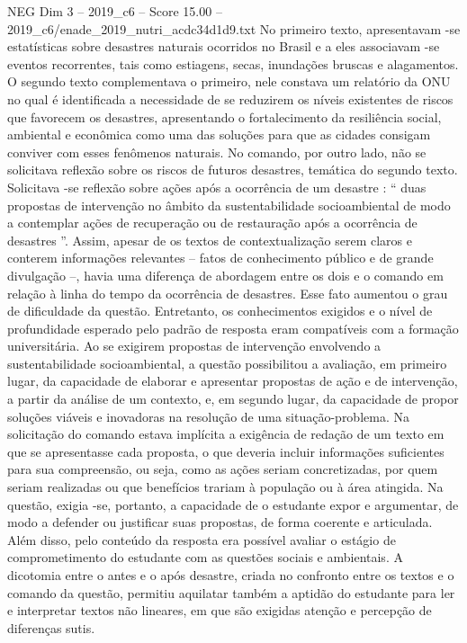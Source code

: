 \begin{textsample}{NEG Dim 3 – 2019\_c6 – Score 15.00 – 2019\_c6/enade\_2019\_nutri\_acdc34d1d9.txt}
No primeiro texto, apresentavam -se estatísticas sobre desastres naturais ocorridos no Brasil e a eles associavam -se eventos recorrentes, tais como estiagens, secas, inundações bruscas e alagamentos.
O segundo texto complementava o primeiro, nele constava um relatório da ONU no qual é identificada a necessidade de se reduzirem os níveis existentes de riscos que favorecem os desastres, apresentando o fortalecimento da resiliência social, ambiental e econômica como uma das soluções para que as cidades consigam conviver com esses fenômenos naturais.
No comando, por outro lado, não se solicitava reflexão sobre os riscos de futuros desastres, temática do segundo texto.
Solicitava -se reflexão sobre ações após a ocorrência de um desastre : “ duas propostas de intervenção no âmbito da sustentabilidade socioambiental de modo a contemplar ações de recuperação ou de restauração após a ocorrência de desastres ”.
Assim, apesar de os textos de contextualização serem claros e conterem informações relevantes – fatos de conhecimento público e de grande divulgação –, havia uma diferença de abordagem entre os dois e o comando em relação à linha do tempo da ocorrência de desastres.
Esse fato aumentou o grau de dificuldade da questão.
Entretanto, os conhecimentos exigidos e o nível de profundidade esperado pelo padrão de resposta eram compatíveis com a formação universitária.
Ao se exigirem propostas de intervenção envolvendo a sustentabilidade socioambiental, a questão possibilitou a avaliação, em primeiro lugar, da capacidade de elaborar e apresentar propostas de ação e de intervenção, a partir da análise de um contexto, e, em segundo lugar, da capacidade de propor soluções viáveis e inovadoras na resolução de uma situação-problema.
Na solicitação do comando estava implícita a exigência de redação de um texto em que se apresentasse cada proposta, o que deveria incluir informações suficientes para sua compreensão, ou seja, como as ações seriam concretizadas, por quem seriam realizadas ou que benefícios trariam à população ou à área atingida.
Na questão, exigia -se, portanto, a capacidade de o estudante expor e argumentar, de modo a defender ou justificar suas propostas, de forma coerente e articulada.
Além disso, pelo conteúdo da resposta era possível avaliar o estágio de comprometimento do estudante com as questões sociais e ambientais.
A dicotomia entre o antes e o após desastre, criada no confronto entre os textos e o comando da questão, permitiu aquilatar também a aptidão do estudante para ler e interpretar textos não lineares, em que são exigidas atenção e percepção de diferenças sutis.

\end{textsample}
